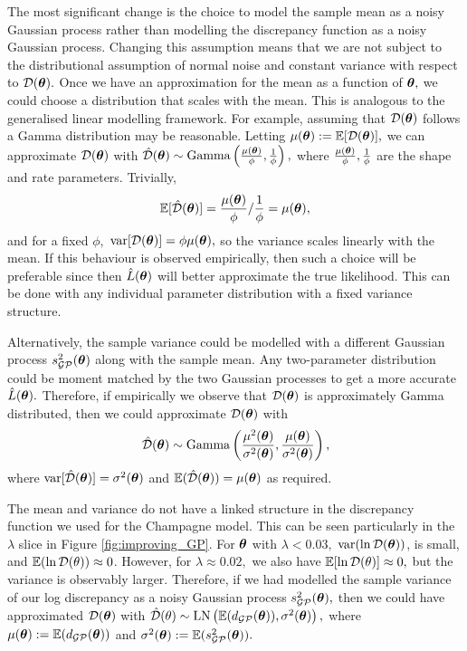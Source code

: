 The most significant change is the choice to model the sample mean as a noisy
Gaussian process rather than modelling the discrepancy function as a noisy
Gaussian process. 
Changing this assumption means that we are not subject to the distributional 
assumption of normal noise and constant variance 
with respect to $\mathcal{D}(\bm{\theta}).$ Once we have an approximation for the mean
as a function of $\bm{\theta},$ we could choose a distribution that scales
with the mean. This is analogous to the generalised linear modelling framework.
For example, assuming that $\mathcal{D}(\bm{\theta})$ follows a
Gamma distribution may be reasonable. 
Letting $\mu(\bm{\theta}) := \operatorname{\mathbb{E}}[\mathcal{D}(\bm{\theta})],$ we can
approximate $\mathcal{D}(\bm{\theta})$ with
$
    \hat{\mathcal{D}}(\bm{\theta})
    \sim \mathrm{Gamma}\left(\frac{\mu(\bm{\theta})}{\phi}, \frac{1}{\phi}\right),
$
where $\frac{\mu(\bm{\theta})}{\phi}, \frac{1}{\phi}$ are the shape and rate
parameters. Trivially,
$$
    \operatorname{\mathbb{E}}[\hat{\mathcal{D}}(\bm{\theta})]
    = \frac{\mu(\bm{\theta})}{\phi}/\frac{1}{\phi} = \mu(\bm{\theta}),
$$
and for a fixed $\phi,$ $\operatorname{var}[\mathcal{D}(\bm{\theta})] = \phi\mu(\bm{\theta}),$ so the variance
scales linearly with the mean. If this behaviour is observed
empirically, then such a choice will be preferable since then
$\hat{L}(\bm{\theta})$ will better approximate the
true likelihood. This can be done with any individual parameter distribution
with
a fixed variance structure.

Alternatively, the sample variance could be modelled with a different
Gaussian process $s^2_{\mathcal{GP}}(\bm{\theta})$ along with the sample mean.
Any two-parameter distribution could be moment matched by
the two Gaussian processes to get a more accurate $\hat{L}(\bm{\theta}).$
Therefore, if empirically we observe that $\mathcal{D}(\bm{\theta})$ is approximately Gamma
distributed, then we could approximate $\mathcal{D}(\bm{\theta})$ with
$$
    \hat{\mathcal{D}}(\bm{\theta})
    \sim \mathrm{Gamma}\left(
    \frac{\mu^2(\bm{\theta})}{\sigma^2(\bm{\theta})},
    \frac{\mu(\bm{\theta})}{\sigma^2(\bm{\theta})}
    \right),
$$ where $\operatorname{var}[\hat{\mathcal{D}}(\bm{\theta})] = \sigma^2(\bm{\theta})$ and
$\operatorname{\mathbb{E}}(\hat{\mathcal{D}}(\bm{\theta})) =\mu(\bm{\theta})$ as required.

The mean and variance do not have a linked structure in the discrepancy function
we used for the Champagne model.
This can be seen particularly in the $\lambda$ slice in Figure
\ref{fig:improving_GP}.
For $\bm{\theta}$ with $\lambda < 0.03,$ $\operatorname{var}(\ln\mathcal{D}(\bm{\theta}))$, is small, and
$\operatorname{\mathbb{E}}(\ln\mathcal{D}(\theta))\approx 0$. However, for $\lambda \approx 0.02,$ we also have
$\operatorname{\mathbb{E}}[\ln\mathcal{D}(\theta)] \approx 0,$ but the variance is observably larger. Therefore,
if we had modelled the sample variance of our log discrepancy as
a noisy Gaussian process $s^2_{\mathcal{GP}}(\bm{\theta}),$ then we could have approximated
$\mathcal{D}(\bm{\theta})$ with
$\hat{\mathcal{D}}(\theta) \sim \operatorname{LN}\left(\operatorname{\mathbb{E}}(d_{\mathcal{GP}}(\bm{\theta})), \sigma^2(\bm{\theta})\right),$
where $\mu(\bm{\theta}) := \operatorname{\mathbb{E}}(d_{\mathcal{GP}}(\bm{\theta}))$ and
$\sigma^2(\bm{\theta}) := \operatorname{\mathbb{E}}(s^2_{\mathcal{GP}}(\bm{\theta})).$

